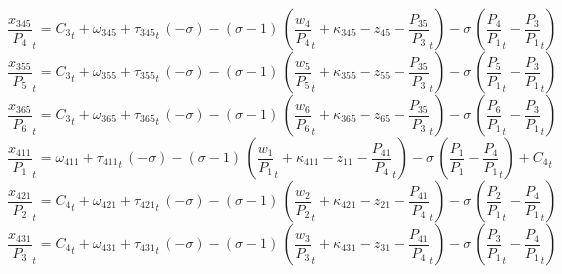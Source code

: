 \begin{dmath}
{{\frac{x_{345}}{P_{4}}}}_{t}={{C_{3}}}_{t}+{{\omega_{345}}}+{{\tau_{345}}}_{t}\, \left(-{{\sigma}}\right)-\left({{\sigma}}-1\right)\, \left({{\frac{w_{4}}{P_{4}}}}_{t}+{{\kappa_{345}}}-{{z_{45}}}-{{\frac{P_{35}}{P_{3}}}}_{t}\right)-{{\sigma}}\, \left({{\frac{P_{4}}{P_{1}}}}_{t}-{{\frac{P_{3}}{P_{1}}}}_{t}\right)
\end{dmath}
\begin{dmath}
{{\frac{x_{355}}{P_{5}}}}_{t}={{C_{3}}}_{t}+{{\omega_{355}}}+{{\tau_{355}}}_{t}\, \left(-{{\sigma}}\right)-\left({{\sigma}}-1\right)\, \left({{\frac{w_{5}}{P_{5}}}}_{t}+{{\kappa_{355}}}-{{z_{55}}}-{{\frac{P_{35}}{P_{3}}}}_{t}\right)-{{\sigma}}\, \left({{\frac{P_{5}}{P_{1}}}}_{t}-{{\frac{P_{3}}{P_{1}}}}_{t}\right)
\end{dmath}
\begin{dmath}
{{\frac{x_{365}}{P_{6}}}}_{t}={{C_{3}}}_{t}+{{\omega_{365}}}+{{\tau_{365}}}_{t}\, \left(-{{\sigma}}\right)-\left({{\sigma}}-1\right)\, \left({{\frac{w_{6}}{P_{6}}}}_{t}+{{\kappa_{365}}}-{{z_{65}}}-{{\frac{P_{35}}{P_{3}}}}_{t}\right)-{{\sigma}}\, \left({{\frac{P_{6}}{P_{1}}}}_{t}-{{\frac{P_{3}}{P_{1}}}}_{t}\right)
\end{dmath}
\begin{dmath}
{{\frac{x_{411}}{P_{1}}}}_{t}={{\omega_{411}}}+{{\tau_{411}}}_{t}\, \left(-{{\sigma}}\right)-\left({{\sigma}}-1\right)\, \left({{\frac{w_{1}}{P_{1}}}}_{t}+{{\kappa_{411}}}-{{z_{11}}}-{{\frac{P_{41}}{P_{4}}}}_{t}\right)-{{\sigma}}\, \left({{\frac{P_{1}}{P_{1}}}}-{{\frac{P_{4}}{P_{1}}}}_{t}\right)+{{C_{4}}}_{t}
\end{dmath}
\begin{dmath}
{{\frac{x_{421}}{P_{2}}}}_{t}={{C_{4}}}_{t}+{{\omega_{421}}}+{{\tau_{421}}}_{t}\, \left(-{{\sigma}}\right)-\left({{\sigma}}-1\right)\, \left({{\frac{w_{2}}{P_{2}}}}_{t}+{{\kappa_{421}}}-{{z_{21}}}-{{\frac{P_{41}}{P_{4}}}}_{t}\right)-{{\sigma}}\, \left({{\frac{P_{2}}{P_{1}}}}_{t}-{{\frac{P_{4}}{P_{1}}}}_{t}\right)
\end{dmath}
\begin{dmath}
{{\frac{x_{431}}{P_{3}}}}_{t}={{C_{4}}}_{t}+{{\omega_{431}}}+{{\tau_{431}}}_{t}\, \left(-{{\sigma}}\right)-\left({{\sigma}}-1\right)\, \left({{\frac{w_{3}}{P_{3}}}}_{t}+{{\kappa_{431}}}-{{z_{31}}}-{{\frac{P_{41}}{P_{4}}}}_{t}\right)-{{\sigma}}\, \left({{\frac{P_{3}}{P_{1}}}}_{t}-{{\frac{P_{4}}{P_{1}}}}_{t}\right)
\end{dmath}
